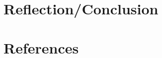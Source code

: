 \documentclass{article}
\begin{document}
\section{Reflection/Conclusion}


\section{References}
    

 
\end{document}
